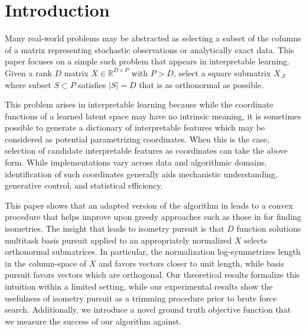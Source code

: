 \section{Introduction}
\label{sec:introduction}

Many real-world problems may be abstracted as selecting a subset of the columns of a matrix representing stochastic observations or analytically exact data.
This paper focuses on a simple such problem that appears in interpretable learning.
Given a rank $D$ matrix $ X \in \mathbb R^{D \times P}$ with $P > D$, select a square submatrix $ X_{.\mathcal S}$ where subset $ S \subset P$ satisfies $| S| = D$ that is as orthonormal as possible.

This problem arises in interpretable learning because while the coordinate functions of a learned latent space may have no intrinsic meaning, it is sometimes possible to generate a dictionary of interpretable features which may be considered as potential parametrizing coordinates.
When this is the case, selection of candidate interpretable features as coordinates can take the above form.
While implementations vary across data and algorithmic domains, identification of such coordinates generally aids mechanistic understanding, generative control, and statistical efficiency.

This paper shows that an adapted version of the algorithm in \citet{Koelle2024-no} leads to a convex procedure that helps improve upon greedy approaches such as those in \citet{5895106, NEURIPS2019_6a10bbd4, Kohli2021-lr, Jones2007-uc} for finding isometries.
The insight that leads to isometry pursuit is that $D$ function solutions multitask basis pursuit applied to an appropriately normalized $ X$ selects orthonormal submatrices.
In particular, the normalization log-symmetrizes length in the column-space of $ X$ and favors vectors closer to unit length, while basis pursuit favors vectors which are orthogonal.
Our theoretical results formalize this intuition within a limited setting, while our experimental results show the usefulness of isometry pursuit as a trimming procedure prior to brute force search.
Additionally, we introduce a novel ground truth objective function that we measure the success of our algorithm against.
